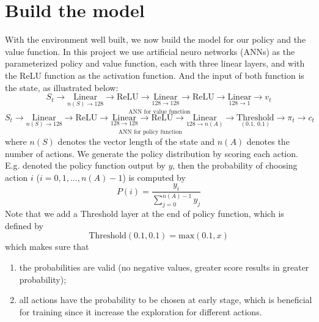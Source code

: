 \documentclass[11pt]{article}
\begin{document}
\section{Build the model}
With the environment well built, we now build the model for our policy and the
value function. In this project we use artificial neuro networks (ANNs) as the 
parameterized policy and value function, each with three linear layers, and 
with the ReLU function as the activation function. And the input of both 
function is the state, as illustrated below:
\[S_t\rightarrow\underset{\text{ANN for value function}}{
        \boxed{
            \underset{n(S)\rightarrow 128}{\text{Linear}}
            \rightarrow\text{ReLU}
            \rightarrow\underset{128\rightarrow 128}{\text{Linear}}
            \rightarrow\text{ReLU}
            \rightarrow\underset{128\rightarrow 1}{\text{Linear}}
        }
}\rightarrow v_t\]
\[S_t\rightarrow\underset{\text{ANN for policy function}}{
        \boxed{
            \underset{n(S)\rightarrow 128}{\text{Linear}}
            \rightarrow\text{ReLU}
            \rightarrow\underset{128\rightarrow 128}{\text{Linear}}
            \rightarrow\text{ReLU}
            \rightarrow\underset{128\rightarrow n(A)}{\text{Linear}}
            \rightarrow\underset{(0.1, \: 0.1)}{\text{Threshold}}
        }
}\rightarrow \pi_t\rightarrow c_t\]
where \(n(S)\) denotes the vector length of the state and \(n(A)\) denotes 
the number of actions. 
\vspace{3mm}\newline We generate the policy distribution by scoring each 
action. E.g. denoted the policy function output by \(y\), then the probability 
of choosing action \(i\) (\(i=0, 1, ..., n(A) - 1\)) is computed by 
\[P(i)=\frac{y_i}{\sum_{j=0}^{n(A)-1} y_j}\]
Note that we add a Threshold layer at the end of policy 
function, which is defined by 
\[\text{Threshold}(0.1, 0.1)=\text{max}(0.1, x)\]
which makes sure that 
\begin{enumerate}
    \item the probabilities are valid (no negative values, greater score 
        results in greater probability);
    \item all actions have the probability to be chosen at early stage, which 
        is beneficial for training since it increase the exploration for 
        different actions.
\end{enumerate}
\end{document}
